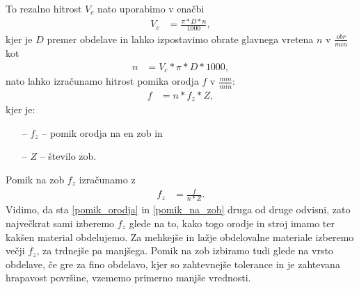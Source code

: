 To rezalno hitrost \(V_c\) nato uporabimo v enačbi
\begin{equation}
	\begin{split}
		V_c &= \frac{\pi*D*n}{1000},
	\end{split}
\end{equation}
kjer je \(D\) premer obdelave in lahko izpostavimo obrate glavnega
vretena \(n\) v \(\frac{obr}{min}\) kot
\begin{equation}
	\begin{split}
		n &= V_c * \pi * D * 1000,
	\end{split}
\end{equation}
nato lahko izračunamo hitrost pomika orodja \(f\) v \(\frac{mm}{min}\):
\begin{equation}
	\label{pomik_orodja}
	\begin{split}
		f &= n * f_z * Z,
	\end{split}
\end{equation}
kjer je:
\begin{itemize}
	\item[--] \(f_z\) -- pomik orodja na en zob in
	\item[--] \(Z\) -- število zob.
\end{itemize}
Pomik na zob \(f_z\) izračunamo z
\begin{equation}
	\label{pomik_na_zob}
	\begin{split}
		f_z &= \frac{f}{n * Z}.
	\end{split}
\end{equation}
Vidimo, da sta \eqref{pomik_orodja} in \eqref{pomik_na_zob} druga od
druge odvisni, zato največkrat sami izberemo \(f_z\) glede na to,
kako togo orodje in stroj imamo ter kakšen material obdelujemo.
Za mehkejše in lažje obdelovalne materiale izberemo večji \(f_z\),
za trdnejše pa manjšega. Pomik na zob izbiramo tudi glede na vrsto obdelave,
če gre za fino obdelavo, kjer so zahtevnejše tolerance in je zahtevana
hrapavost površine, vzememo primerno manjše vrednosti.